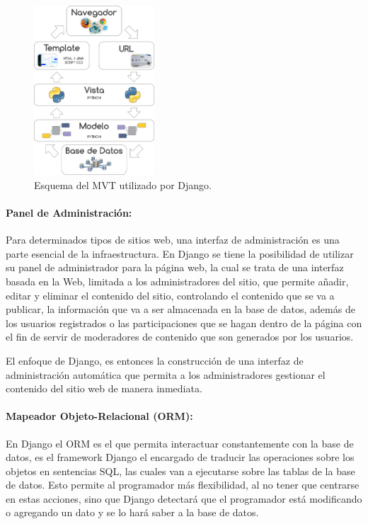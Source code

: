\documentclass[journal,transmag]{IEEEtran}
\begin{document}
\begin{figure}[t]
\centering
\includegraphics[width=0.4\textwidth]{diagrama_MVC.png}
\caption{Esquema del MVT utilizado por Django.}
\label{fig:esq_Django}
\end{figure}

\paragraph{Panel de Administración:}

Para determinados tipos de sitios web, una interfaz de administración es una parte esencial de la infraestructura. En Django se tiene la posibilidad de utilizar su panel de administrador para la página web, la cual se trata de una interfaz basada en la Web, limitada a los administradores del sitio, que permite añadir, editar y eliminar el contenido del sitio, controlando el contenido que se va a publicar, la información que va a ser almacenada en la base de datos, además de los usuarios registrados o las participaciones que se hagan dentro de la página con el fin de servir de moderadores de contenido que son generados por los usuarios. 

El enfoque de Django, es entonces la construcción de una interfaz de administración automática que permita a los administradores gestionar el contenido del sitio web de manera inmediata.

\paragraph{Mapeador Objeto-Relacional (ORM):} 

En Django el ORM es el que permita interactuar constantemente con la base de datos, es el framework Django el encargado de traducir las operaciones sobre los objetos en sentencias SQL, las cuales van a ejecutarse sobre las tablas de la base de datos. Esto permite al programador más flexibilidad, al no tener que centrarse en estas acciones, sino que Django detectará que el programador está modificando o agregando un dato y se lo hará saber a la base de datos.
\end{document}
